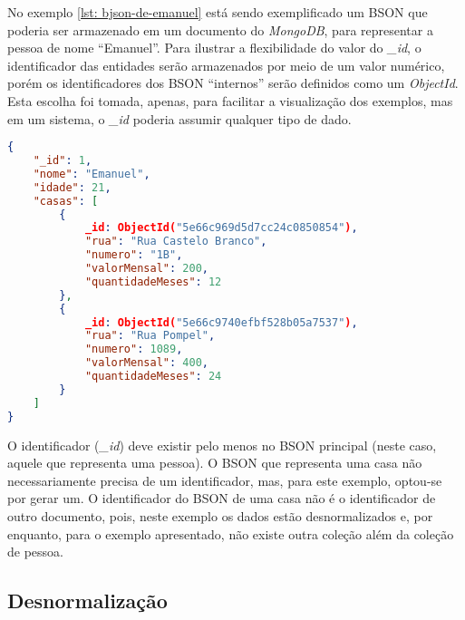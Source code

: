     


No exemplo \ref{lst: bjson-de-emanuel} está sendo exemplificado um BSON que poderia ser armazenado em um documento do \textit{MongoDB}, para representar a pessoa de nome ``Emanuel''. Para ilustrar a flexibilidade do valor do \textit{\_id}, o identificador das entidades serão armazenados por meio de um valor numérico, porém os identificadores dos BSON ``internos'' serão definidos como um \textit{ObjectId}. Esta escolha foi tomada, apenas, para facilitar a visualização dos exemplos, mas em um sistema, o \textit{\_id} poderia assumir qualquer tipo de dado.

\begin{lstlisting}[language=json, caption={BJSON da pessoa \textit{Emanuel}\label{lst: bjson-de-emanuel}}]
{
    "_id": 1,
    "nome": "Emanuel",
    "idade": 21,
    "casas": [
        {
            _id: ObjectId("5e66c969d5d7cc24c0850854"),
            "rua": "Rua Castelo Branco",
            "numero": "1B",
            "valorMensal": 200,
            "quantidadeMeses": 12
        },
        {
            _id: ObjectId("5e66c9740efbf528b05a7537"),
            "rua": "Rua Pompel",
            "numero": 1089,
            "valorMensal": 400,
            "quantidadeMeses": 24
        }
    ]
}
\end{lstlisting}

O identificador (\textit{\_id}) deve existir pelo menos no BSON principal (neste caso, aquele que representa uma pessoa). O BSON que representa uma casa não necessariamente precisa de um identificador, mas, para este exemplo, optou-se por gerar um. O identificador do BSON de uma casa não é o identificador de outro documento, pois, neste exemplo os dados estão desnormalizados e, por enquanto, para o exemplo apresentado, não existe outra coleção além da coleção de pessoa.

\subsection{Desnormalização}

